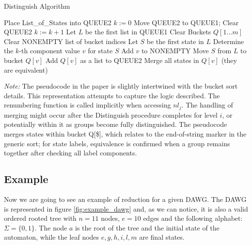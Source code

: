 \begin{algorithm}[h]
    \caption{Distinguish Algorithm} \label{alg:distinguish}
    \begin{algorithmic}[1] 
        \State Place List\_of\_States into QUEUE2 
        \State $k := 0$ 
        \Repeat
            \State Move QUEUE2 to QUEUE1; Clear QUEUE2
            \State $k := k + 1$
                \State Let $L$ be the first list in QUEUE1
                \State Clear Buckets $Q[1 \dots m]$ 
                \State Clear NONEMPTY list of bucket indices
                    \State Let $S$ be the first state in $L$
                    \State Determine the $k$-th component value $v$ for state $S$
                        \State Add $v$ to NONEMPTY
                    \EndIf
                    \State Move $S$ from $L$ to bucket $Q[v]$
                \EndWhile
                        \State Add $Q[v]$ as a list to QUEUE2 
                        \State Merge all states in $Q[v]$ (they are equivalent)
                    \EndIf
                \EndFor
            \EndWhile
         
        \EndFunction
    \end{algorithmic}
\end{algorithm}

\textit{Note:} The pseudocode in the paper is slightly intertwined with the bucket sort details. This representation attempts to capture the logic described. The renumbering function is called implicitly when accessing $nl_j$. The handling of merging might occur after the Distinguish procedure completes for level $i$, or potentially within it as groups become fully distinguished. The pseudocode merges states within bucket Q[\$], which relates to the end-of-string marker in the generic sort; for state labels, equivalence is confirmed when a group remains together after checking all label components.

\subsection{Example}
Now we are going to see an example of reduction for a given DAWG. The DAWG is represented in figure \ref{fig:example_dawg} and, as we can notice, it is also a valid ordered rooted tree with $n = 11$ nodes, $e = 10$ edges and the following alphabet: $\Sigma = \{0, 1\}$. The node $a$ is the root of the tree and the initial state of the automaton, while the leaf nodes $e,g,h,i,l,m$ are final states.

